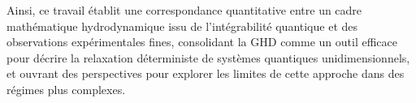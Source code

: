 Ainsi, ce travail établit une correspondance quantitative entre un cadre mathématique hydrodynamique issu de l’intégrabilité quantique et des observations expérimentales fines, consolidant la GHD comme un outil efficace pour décrire la relaxation déterministe de systèmes quantiques unidimensionnels, et ouvrant des perspectives pour explorer les limites de cette approche dans des régimes plus complexes.

